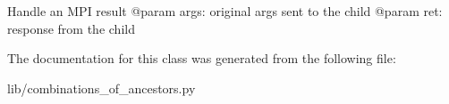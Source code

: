 \begin{DoxyVerb}Handle an MPI result
@param args: original args sent to the child
@param ret: response from the child
\end{DoxyVerb}
 

The documentation for this class was generated from the following file\+:\begin{DoxyCompactItemize}
\item 
lib/combinations\+\_\+of\+\_\+ancestors.\+py\end{DoxyCompactItemize}
